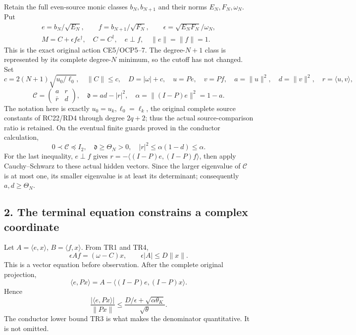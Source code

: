 \documentclass[10pt]{article}
\begin{document}
Retain the full even-source monic classes \(b_N,b_{N+1}\) and their norms \(E_N,F_N,\omega_N\). Put \[
\begin{gathered}
e=b_N/\sqrt{E_N},\qquad f=b_{N+1}/\sqrt{F_N},\qquad
\epsilon=\sqrt{E_NF_N}/\omega_N,\\
M=C+\epsilon f e^\dagger,\quad C=C^\dagger,\quad e\perp f,\quad
\|e\|=\|f\|=1.
\end{gathered}\tag{TR4}
\] This is the exact original action CE5/OCP5--7. The degree-\(N+1\) class is represented by its complete degree-\(N\) minimum, so the cutoff has not changed. Set \[
c=2(N+1)\sqrt{u_0/\ell_0},\quad \|C\|\le c,\quad
D=|\omega|+c,\quad
u=Pe,\quad v=Pf,\quad
a=\|u\|^2,\quad d=\|v\|^2,\quad r=\langle u,v\rangle,
\] \[
\mathcal C=\begin{pmatrix}a&r\\\bar r&d\end{pmatrix},\quad
\mathfrak d=ad-|r|^2,\quad
\alpha=\|(I-P)e\|^2=1-a.
\tag{TR5}
\] The notation here is exactly \(u_0=u_k,\ell_0=\ell_k\), the original complete source constants of RC22/RD4 through degree \(2q+2\); thus the actual source-comparison ratio is retained. On the eventual finite guards proved in the conductor calculation, \[
0\prec\mathcal C\preceq I_2,\quad
\mathfrak d\ge\Theta_N>0,\quad |r|^2\le\alpha(1-d)\le\alpha.
\tag{TR6}
\] For the last inequality, \(e\perp f\) gives \(r=-\langle(I-P)e,(I-P)f\rangle\), then apply Cauchy--Schwarz to these actual hidden vectors. Since the larger eigenvalue of \(\mathcal C\) is at most one, its smaller eigenvalue is at least its determinant; consequently \(a,d\ge\Theta_N\).

\subsection{2. The terminal equation constrains a complex coordinate}\label{the-terminal-equation-constrains-a-complex-coordinate}

Let \(A=\langle e,x\rangle\), \(B=\langle f,x\rangle\). From TR1 and TR4, \[
\epsilon A f=(\omega-C)x,\qquad
\epsilon|A|\le D\|x\|.
\tag{TR7}
\] This is a vector equation before observation. After the complete original projection, \[
\langle e,Px\rangle=A-\langle(I-P)e,(I-P)x\rangle.
\] Hence \[
\frac{|\langle e,Px\rangle|}{\|Px\|}
\le\frac{D/\epsilon+\sqrt{\alpha\theta_K}}{\sqrt\theta}.
\tag{TR8}
\] The conductor lower bound TR3 is what makes the denominator quantitative. It is not omitted.
\end{document}
